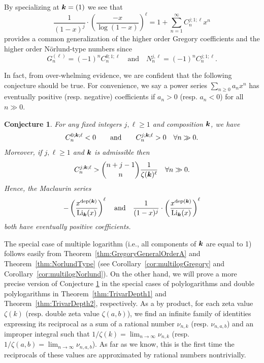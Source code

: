 \documentclass[11pt]{article}
\newcommand{\bfk}{{\boldsymbol{\sl{k}}}}
\DeclareMathOperator*{\dep}{dep}
\DeclareMathOperator{\Li}{Li}
\theoremstyle{plain}
\newtheorem{con}[thm]{Conjecture}
\theoremstyle{definition}
\begin{document}
By specializing at $\bfk=(1)$ we see that
\begin{equation*}
 \frac{1}{(1-x)^j}\cdot \left(\frac{-x}{\log(1-x)}\right)^\ell =1+\sum_{n=1}^\infty C_{n}^{j;1;\ell}x^n
\end{equation*}
provides a common generalization of the higher order Gregory coefficients
and the higher order N\"orlund-type numbers since
\begin{equation*}
  G_n^{(\ell)}=(-1)^{n} C_{n}^{0;1;\ell}\quad\text{and}\quad
  N_n^{j,\ell}=(-1)^{n} C_{n}^{j;1;\ell}.
\end{equation*}

In fact, from over-whelming evidence, we are confident that the following conjecture should be true.
For convenience, we say a power series $\sum_{n\ge 0} a_n x^n$ has eventually positive (resp. negative)
coefficients if $a_n>0$ (resp. $a_n<0$)  for all $n\gg 0$.

\begin{con}\label{conj:Trivar}
For any fixed integers $j,\ell\ge 1$ and composition $\bfk$, we have
\begin{equation*}
C_{n}^{0;\bfk;\ell}<0 \qquad\text{and}\qquad C_{n}^{j;\bfk;\ell}>0 \quad \forall n\gg 0.
\end{equation*}
Moreover, if $j,\ell\ge 1$ and $\bfk$ is admissible then
\begin{equation*}
 C_{n}^{j;\bfk;\ell}>\binom{n+j-1}{n}\frac{1}{\zeta(\bfk)^{\ell}} \quad \forall n\gg 0.
\end{equation*}
Hence, the Maclaurin series
\begin{equation*}
 -\left(\frac{x^{\dep(\bfk)}}{\Li_\bfk(x)}\right)^\ell  \quad\text{and}\quad
\frac{1}{(1-x)^j}\cdot \left(\frac{x^{\dep(\bfk)}}{\Li_\bfk(x)}\right)^\ell
\end{equation*}
both have \emph{eventually} positive coefficients.
\end{con}

The special case of multiple logarithm (i.e., all components of $\bfk$ are equal to 1) follows easily from
Theorem~\ref{thm:GregoryGeneralOrderA} and Theorem~\ref{thm:NorlundType} (see Corollary~\ref{cor:multilogGregory} and Corollary~\ref{cor:multilogNorlund}). On the other hand, we will prove a more precise version of Conjecture \ref{conj:Trivar} in  the special cases of polylogarithms and double polylogarithms in Theorem~\ref{thm:TrivarDepth1} and Theorem~\ref{thm:TrivarDepth2}, respectively. As a by product, for each zeta value $\zeta(k)$ (resp. double zeta value $\zeta(a,b)$), we find an infinite family of identities expressing its reciprocal as a sum of a rational number $\nu_{n,k}$ (resp. $\nu_{n,a,b}$) and an improper integral such that $1/\zeta(k)=\lim_{n\to\infty} \nu_{n,k}$ (resp. $1/\zeta(a,b)=\lim_{n\to\infty} \nu_{n,a,b}$). As far as we know, this is the first time the reciprocals of these values are approximated by rational numbers nontrivially.
\end{document}
